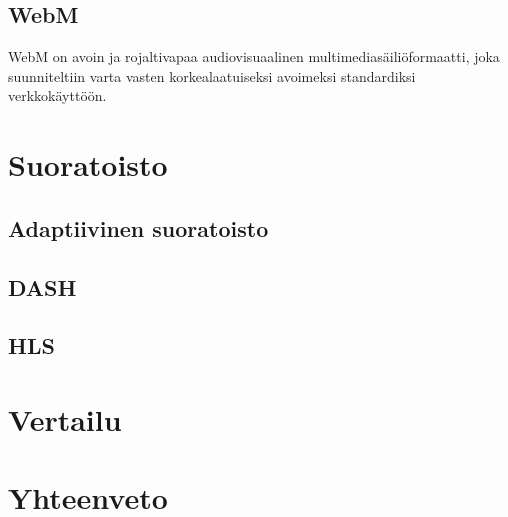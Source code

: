 \documentclass[finnish, 12pt, a4paper, elec, utf8, a-1b, online]{aaltothesis}
\begin{document}
\subsection*{WebM}

WebM on avoin ja rojaltivapaa audiovisuaalinen multimediasäiliöformaatti, joka suunniteltiin varta vasten korkealaatuiseksi avoimeksi standardiksi verkkokäyttöön. \cite{WebM}

\noindent

\clearpage


\section{Suoratoisto}


\subsection*{Adaptiivinen suoratoisto}


\subsection*{DASH}


\subsection*{HLS}


\clearpage


\section{Vertailu}


\clearpage

\section{Yhteenveto}


\clearpage
\end{document}

